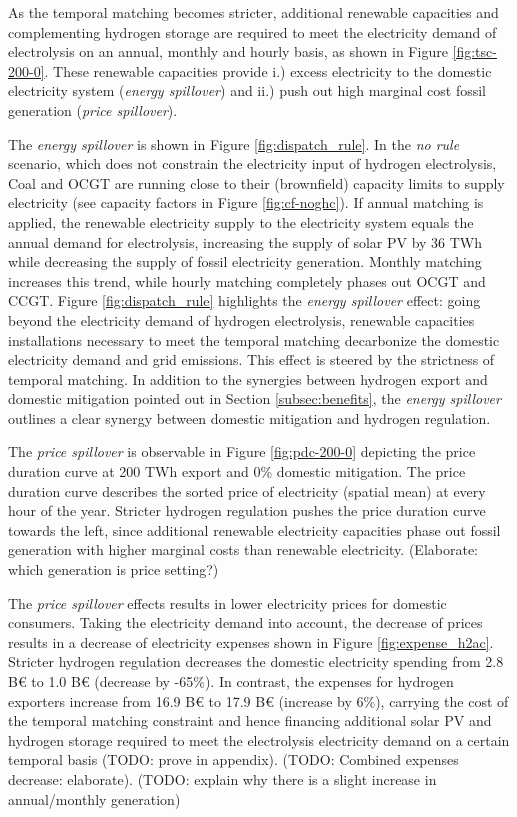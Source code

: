 As the temporal matching becomes stricter, additional renewable capacities and complementing hydrogen storage are required to meet the electricity demand of electrolysis on an annual, monthly and hourly basis, as shown in Figure \ref{fig:tsc-200-0}. These renewable capacities provide i.) excess electricity to the domestic electricity system (\textit{energy spillover})  and ii.) push out high marginal cost fossil generation (\textit{price spillover}).


The \textit{energy spillover} is shown in Figure \ref{fig:dispatch_rule}. In the \textit{no rule} scenario, which does not constrain the electricity input of hydrogen electrolysis, Coal and OCGT are running close to their (brownfield) capacity limits to supply electricity (see capacity factors in Figure \ref{fig:cf-noghc}). If annual matching is applied, the renewable electricity supply to the electricity system equals the annual demand for electrolysis, increasing the supply of solar PV by 36 TWh while decreasing the supply of fossil electricity generation. 
Monthly matching increases this trend, while hourly matching completely phases out OCGT and CCGT. Figure \ref{fig:dispatch_rule} highlights the \textit{energy spillover} effect: going beyond the electricity demand of hydrogen electrolysis, renewable capacities installations necessary to meet the temporal matching decarbonize the domestic electricity demand and grid emissions. This effect is steered by the strictness of temporal matching.
In addition to the synergies between hydrogen export and domestic mitigation pointed out in Section \ref{subsec:benefits}, the \textit{energy spillover} outlines a clear synergy between domestic mitigation and hydrogen regulation.


The \textit{price spillover} is observable in Figure \ref{fig:pdc-200-0} depicting the price duration curve at 200 TWh export and 0\% domestic mitigation. The price duration curve describes the sorted price of electricity (spatial mean) at every hour of the year.
Stricter hydrogen regulation pushes the price duration curve towards the left, since additional renewable electricity capacities phase out fossil generation with higher marginal costs than renewable electricity. (Elaborate: which generation is price setting?)


The \textit{price spillover} effects results in lower electricity prices for domestic consumers. Taking the electricity demand into account, the decrease of prices results in a decrease of electricity expenses shown in 
Figure \ref{fig:expense_h2ac}. Stricter hydrogen regulation decreases the domestic electricity spending from 2.8 B€ to 1.0 B€ (decrease by -65\%). In contrast, the expenses for hydrogen exporters increase from 16.9 B€ to 17.9 B€ (increase by 6\%), carrying the cost of the temporal matching constraint and hence financing additional solar PV and hydrogen storage required to meet the electrolysis electricity demand on a certain temporal basis (TODO: prove in appendix). (TODO: Combined expenses decrease: elaborate). (TODO: explain why there is a slight increase in annual/monthly generation)


